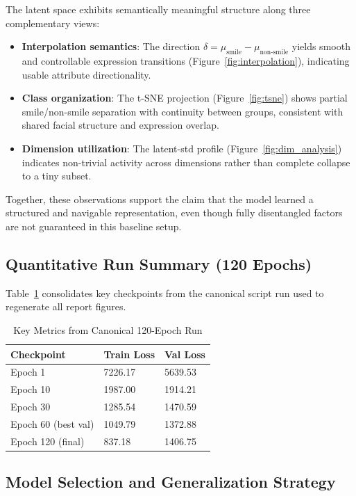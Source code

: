 \documentclass[conference]{IEEEtran}
\begin{document}
The latent space exhibits semantically meaningful structure along three complementary views:
\begin{itemize}
    \item \textbf{Interpolation semantics}: The direction $\delta = \mu_{\text{smile}} - \mu_{\text{non-smile}}$ yields smooth and controllable expression transitions (Figure~\ref{fig:interpolation}), indicating usable attribute directionality.
    \item \textbf{Class organization}: The t-SNE projection (Figure~\ref{fig:tsne}) shows partial smile/non-smile separation with continuity between groups, consistent with shared facial structure and expression overlap.
    \item \textbf{Dimension utilization}: The latent-std profile (Figure~\ref{fig:dim_analysis}) indicates non-trivial activity across dimensions rather than complete collapse to a tiny subset.
\end{itemize}

Together, these observations support the claim that the model learned a structured and navigable representation, even though fully disentangled factors are not guaranteed in this baseline setup.

\subsection{Quantitative Run Summary (120 Epochs)}

Table~\ref{tab:runsummary} consolidates key checkpoints from the canonical script run used to regenerate all report figures.

\begin{table}[t]
\centering
\caption{Key Metrics from Canonical 120-Epoch Run}
\label{tab:runsummary}
\begin{tabular}{@{}lll@{}}
\toprule
\textbf{Checkpoint} & \textbf{Train Loss} & \textbf{Val Loss} \\
\midrule
Epoch 1 & 7226.17 & 5639.53 \\
Epoch 10 & 1987.00 & 1914.21 \\
Epoch 30 & 1285.54 & 1470.59 \\
Epoch 60 (best val) & 1049.79 & 1372.88 \\
Epoch 120 (final) & 837.18 & 1406.75 \\
\bottomrule
\end{tabular}
\end{table}

\subsection{Model Selection and Generalization Strategy}
\end{document}
